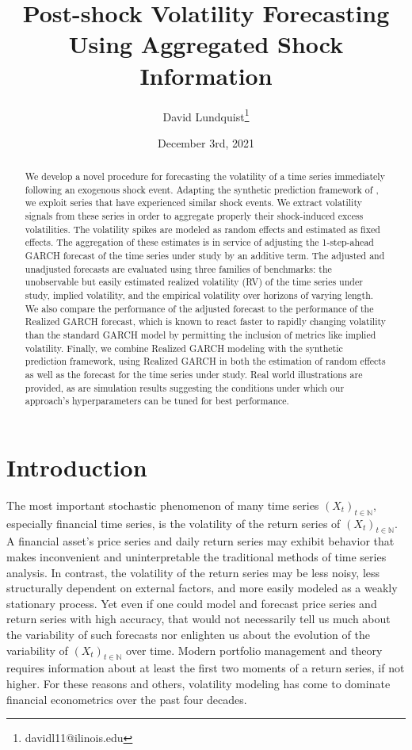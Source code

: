 \documentclass[11pt]{article}
\title{Post-shock Volatility Forecasting Using Aggregated Shock Information}
\author{David Lundquist\thanks{davidl11@ilinois.edu} }
\affil{Department of Statistics, University of Illinois at Urbana-Champaign}
\date{December 3rd, 2021}
\theoremstyle{definition}
\begin{document}
\maketitle

\begin{abstract}
We develop a novel procedure for forecasting the volatility of a time series immediately following an exogenous shock event.  Adapting the synthetic prediction framework of \citet{lin2021minimizing}, we exploit series that have experienced similar shock events.  We extract volatility signals from these series in order to aggregate properly their shock-induced excess volatilities.  The volatility spikes are modeled as random effects and estimated as fixed effects.  The aggregation of these estimates is in service of adjusting the 1-step-ahead GARCH forecast of the time series under study by an additive term.  The adjusted and unadjusted forecasts are evaluated using three families of benchmarks: the unobservable but easily estimated realized volatility (RV) of the time series under study, implied volatility, and the empirical volatility over horizons of varying length.  We also compare the performance of the adjusted forecast to the performance of the Realized GARCH forecast, which is known to react faster to rapidly changing volatility than the standard GARCH model by permitting the inclusion of metrics like implied volatility.   Finally, we combine Realized GARCH modeling with the synthetic prediction framework, using Realized GARCH in both the estimation of random effects as well as the forecast for the time series under study.  Real world illustrations are provided, as are simulation results suggesting the conditions under which our approach's hyperparameters can be tuned for best performance.
\end{abstract}


\section{Introduction}

The most important stochastic phenomenon of many time series $(X_{t})_{t\in\mathbb{N}}$, especially financial time series, is the volatility of the return series of $(X_{t})_{t\in\mathbb{N}}$.  A financial asset's price series and daily return series may exhibit behavior that makes inconvenient and uninterpretable the traditional methods of time series analysis.  In contrast, the volatility of the return series may be less noisy, less structurally dependent on external factors, and more easily modeled as a weakly stationary process.  Yet even if one could model and forecast price series and return series with high accuracy, that would not necessarily tell us much about the variability of such forecasts nor enlighten us about the evolution of the variability of $(X_{t})_{t\in\mathbb{N}}$ over time. Modern portfolio management and theory requires information about at least the first two moments of a return series, if not higher.  For these reasons and others, volatility modeling has come to dominate financial econometrics over the past four decades.  
\end{document}
